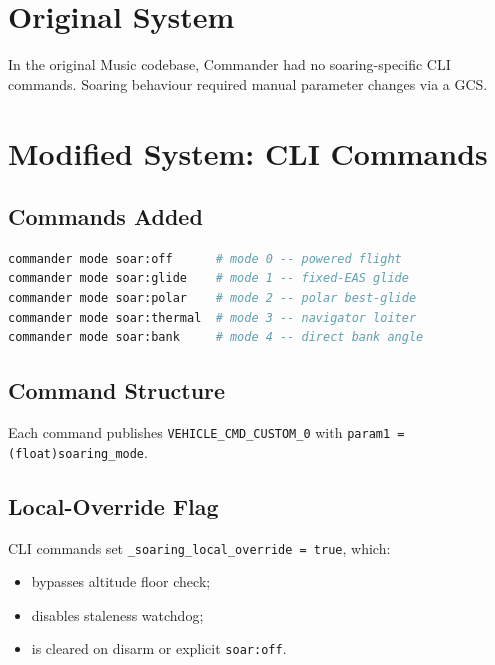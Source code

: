 \documentclass[12pt,a4paper]{report}
\begin{document}
\section{Original System}

In the original Music codebase, Commander had no soaring-specific CLI
commands. Soaring behaviour required manual parameter changes via a GCS.

\section{Modified System: CLI Commands}

\subsection{Commands Added}

\begin{lstlisting}[language=bash]
commander mode soar:off      # mode 0 -- powered flight
commander mode soar:glide    # mode 1 -- fixed-EAS glide
commander mode soar:polar    # mode 2 -- polar best-glide
commander mode soar:thermal  # mode 3 -- navigator loiter
commander mode soar:bank     # mode 4 -- direct bank angle
\end{lstlisting}

\subsection{Command Structure}

Each command publishes \texttt{VEHICLE\_CMD\_CUSTOM\_0} with
\texttt{param1 = (float)soaring\_mode}.

\subsection{Local-Override Flag}

CLI commands set \texttt{\_soaring\_local\_override = true}, which:
\begin{itemize}
  \item bypasses altitude floor check;
  \item disables staleness watchdog;
  \item is cleared on disarm or explicit \texttt{soar:off}.
\end{itemize}

\end{document}
